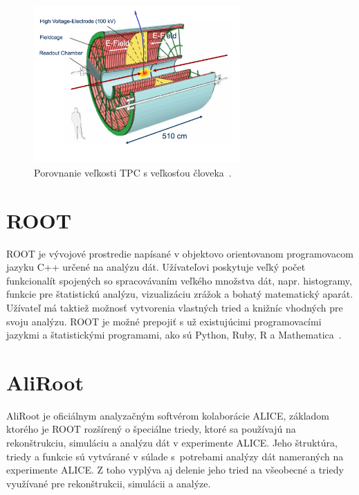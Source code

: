 \documentclass[thesismargins, thesislinespacing]{rnthesis}
\begin{document}
\begin{figure}[hbtp!]
	\begin{center}
	 	\includegraphics[width=0.7\textwidth]{./Obrazky_praca/tpc.png}
		\caption{Porovnanie veľkosti TPC s veľkosťou človeka~\cite{TPCobr}.}
		\label{tpc}
	\end{center}
\end{figure}

\section{ROOT}
ROOT je vývojové prostredie napísané v objektovo orientovanom programovacom jazyku C++ určené na analýzu dát. Užívateľovi poskytuje veľký počet funkcionalít spojených so spracovávaním veľkého množstva dát, napr. histogramy, funkcie pre štatistickú analýzu, vizualizáciu zrážok a bohatý matematický aparát. Užívateľ má taktiež možnosť vytvorenia vlastných tried a knižníc vhodných pre svoju analýzu. ROOT je možné prepojiť s už existujúcimi programovacími jazykmi a štatistickými programami, ako sú Python, Ruby, R a Mathematica~\cite{root}.

\section{AliRoot}
AliRoot \cite{aliroot} je oficiálnym analyzačným softvérom kolaborácie ALICE, základom kto\-ré\-ho je ROOT rozšírený o špeciálne triedy, ktoré sa používajú na rekonštrukciu, simuláciu a analýzu dát v experimente ALICE. Jeho štruktúra, triedy a funkcie sú vytvárané v súlade s~potrebami analýzy dát nameraných na experimente ALICE. Z toho vyplýva aj delenie jeho tried na všeobecné a triedy využívané pre rekonštrukcii, simulácii a analýze. 
\end{document}
